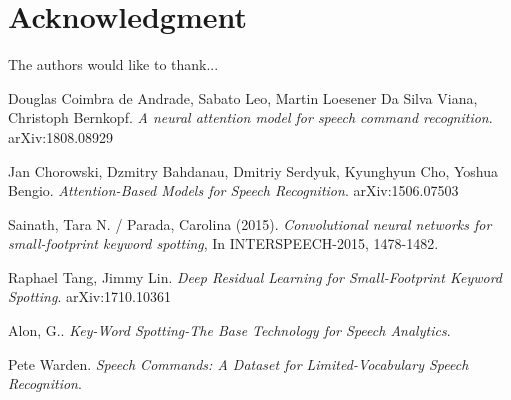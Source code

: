 \documentclass[conference]{IEEEtran}
\begin{document}
\section*{Acknowledgment}


The authors would like to thank...


\begin{thebibliography}{1}
Douglas Coimbra de Andrade, Sabato Leo, Martin Loesener Da Silva Viana, Christoph Bernkopf. \textit{A neural attention model for speech command recognition}. arXiv:1808.08929

Jan Chorowski, Dzmitry Bahdanau, Dmitriy Serdyuk, Kyunghyun Cho, Yoshua Bengio. \textit{Attention-Based Models for Speech Recognition}. arXiv:1506.07503

Sainath, Tara N. / Parada, Carolina (2015). \textit{Convolutional neural networks for small-footprint keyword spotting}, In INTERSPEECH-2015, 1478-1482.

Raphael Tang, Jimmy Lin. \textit{Deep Residual Learning for Small-Footprint Keyword Spotting}. arXiv:1710.10361

Alon, G.. \textit{Key-Word Spotting-The Base Technology for Speech Analytics}.

Pete Warden. \textit{Speech Commands: A Dataset for Limited-Vocabulary Speech Recognition}.
\end{thebibliography}
\end{document}
